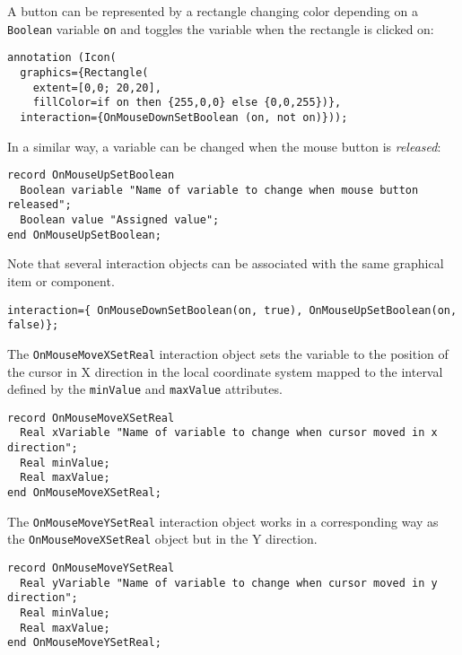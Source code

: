 \begin{example}
A button can be represented by a rectangle changing color depending on a \lstinline!Boolean! variable \lstinline!on! and toggles the
variable when the rectangle is clicked on:
\begin{lstlisting}[language=modelica]
annotation (Icon(
  graphics={Rectangle(
    extent=[0,0; 20,20],
    fillColor=if on then {255,0,0} else {0,0,255})},
  interaction={OnMouseDownSetBoolean (on, not on)}));
\end{lstlisting}
\end{example}

In a similar way, a variable can be changed when the mouse button is
\emph{released}:
\begin{lstlisting}[language=modelica]
record OnMouseUpSetBoolean
  Boolean variable "Name of variable to change when mouse button released";
  Boolean value "Assigned value";
end OnMouseUpSetBoolean;
\end{lstlisting}
Note that several interaction objects can be associated with the same
graphical item or component.

\begin{example}
\begin{lstlisting}[language=modelica]
interaction={ OnMouseDownSetBoolean(on, true), OnMouseUpSetBoolean(on, false)};
\end{lstlisting}
\end{example}

The \lstinline!OnMouseMoveXSetReal! interaction object sets the variable to the
position of the cursor in X direction in the local coordinate system
mapped to the interval defined by the \lstinline!minValue! and \lstinline!maxValue! attributes.

\begin{lstlisting}[language=modelica]
record OnMouseMoveXSetReal
  Real xVariable "Name of variable to change when cursor moved in x direction";
  Real minValue;
  Real maxValue;
end OnMouseMoveXSetReal;
\end{lstlisting}
The \lstinline!OnMouseMoveYSetReal! interaction object works in a corresponding way
as the \lstinline!OnMouseMoveXSetReal! object but in the Y direction.

\begin{lstlisting}[language=modelica]
record OnMouseMoveYSetReal
  Real yVariable "Name of variable to change when cursor moved in y direction";
  Real minValue;
  Real maxValue;
end OnMouseMoveYSetReal;
\end{lstlisting}

